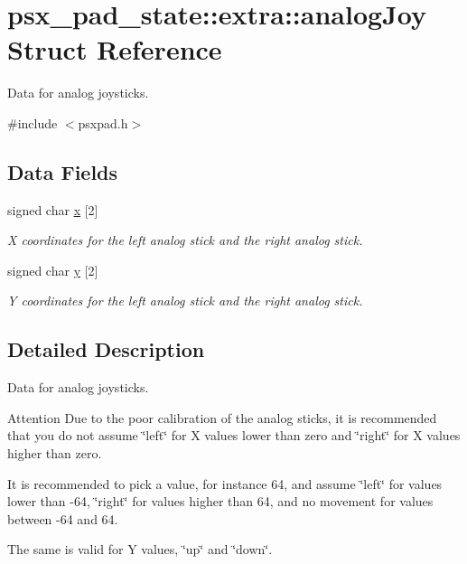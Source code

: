 \hypertarget{structpsx__pad__state_1_1extra_1_1analogJoy}{}\section{psx\+\_\+pad\+\_\+state\+:\+:extra\+:\+:analog\+Joy Struct Reference}
\label{structpsx__pad__state_1_1extra_1_1analogJoy}


Data for analog joysticks.  




{\ttfamily \#include $<$psxpad.\+h$>$}

\subsection*{Data Fields}
\begin{DoxyCompactItemize}
\item 
signed char \hyperlink{structpsx__pad__state_1_1extra_1_1analogJoy_a7c91cf5c544d6224f03ce744b91f04d7}{x} \mbox{[}2\mbox{]}
\begin{DoxyCompactList}\small\item\em X coordinates for the left analog stick and the right analog stick. \end{DoxyCompactList}\item 
signed char \hyperlink{structpsx__pad__state_1_1extra_1_1analogJoy_abbdd8d074005a21dde9bd8f0765f4710}{y} \mbox{[}2\mbox{]}
\begin{DoxyCompactList}\small\item\em Y coordinates for the left analog stick and the right analog stick. \end{DoxyCompactList}\end{DoxyCompactItemize}


\subsection{Detailed Description}
Data for analog joysticks. 

\begin{DoxyAttention}{Attention}
Due to the poor calibration of the analog sticks, it is recommended that you do not assume \char`\"{}left\char`\"{} for X values lower than zero and \char`\"{}right\char`\"{} for X values higher than zero.

It is recommended to pick a value, for instance 64, and assume \char`\"{}left\char`\"{} for values lower than -\/64, \char`\"{}right\char`\"{} for values higher than 64, and no movement for values between -\/64 and 64.

The same is valid for Y values, \char`\"{}up\char`\"{} and \char`\"{}down\char`\"{}. 
\end{DoxyAttention}


